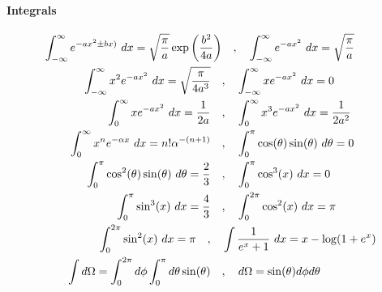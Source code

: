 \paragraph{Integrals}
\begin{align*}
    \int_{-\infty}^\infty e^{-ax^2 \pm bx)} \ dx = \sqrt{\frac{\pi}{a}} \exp \left( \frac{b^2}{4 a} \right)&
    \hspace{10pt} , \hspace{10pt}
    \int_{-\infty}^\infty e^{-a x^2} \ dx = \sqrt{\frac{\pi}{a}}
    \\
    \int_{-\infty}^\infty x^2 e^{-a x^2} \ dx = \sqrt{\frac{\pi}{4 a^3}}
    \hspace{10pt} &, \hspace{10pt}
    \int_{-\infty}^\infty x e^{-a x^2} \ dx = 0
    \\
    \int_0^\infty x e^{-a x^2} \ dx = \frac{1}{2a}
    \hspace{10pt} &, \hspace{10pt}
    \int_0^\infty x^3 e^{-a x^2} \ dx = \frac{1}{2 a^2}
    \\
    \int_0^\infty x^n e^{- \alpha x} \ dx = n! \alpha^{-(n+1)}
    \hspace{10pt} &, \hspace{10pt}
    \int_0^\pi \cos(\theta) \sin(\theta) \ d \theta = 0
    \\
    \int_0^\pi \cos^2(\theta) \sin(\theta) \ d \theta = \frac{2}{3}
    \hspace{10pt} &, \hspace{10pt}
    \int_0^\pi \cos^3(x) \ dx  = 0
    \\
    \int_0^\pi \sin^3 (x) \ dx = \frac{4}{3}
    \hspace{10pt} &, \hspace{10pt}
    \int_0^{2 \pi} \cos^2(x) \ dx = \pi
    \\
    \int_0^{2 \pi} \sin^2(x) \ dx = \pi 
    \hspace{10pt} , \hspace{10pt}
    &\int \frac{1}{e^x + 1} \ dx = x - \log(1+e^x)
    \\
    \int d \Omega = \int_0^{2 \pi} d \phi \int_0^\pi d \theta \sin(\theta)
    \hspace{10pt} &, \hspace{10pt}
    d \Omega = \sin(\theta) d \phi d \theta
\end{align*}

